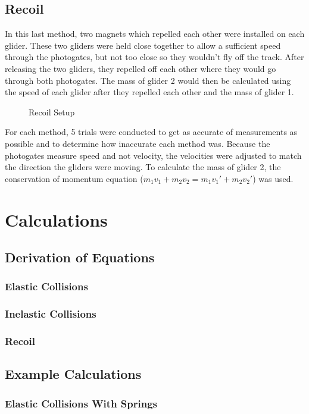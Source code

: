 \documentclass[12pt]{article}
\begin{document}
\subsection{Recoil}
In this last method, two magnets which repelled each other were installed on each glider. These two gliders were held close together to allow a sufficient speed through the photogates, but not too close so they wouldn't fly off the track. After releasing the two gliders, they repelled off each other where they would go through both photogates. The mass of glider 2 would then be calculated using the speed of each glider after they repelled each other and the mass of glider 1.
\begin{figure}[H]   %
    \centering
    \caption{Recoil Setup}
\end{figure}
For each method, 5 trials were conducted to get as accurate of measurements as possible and to determine how inaccurate each method was. Because the photogates measure speed and not velocity, the velocities were adjusted to match the direction the gliders were moving. To calculate the mass of glider 2, the conservation of momentum equation ($m_1v_1+m_2v_2=m_1v_1'+m_2v_2'$) was used.

\newpage
\section{Calculations}
\subsection{Derivation of Equations}
\subsubsection{Elastic Collisions}
\subsubsection{Inelastic Collisions}
\subsubsection{Recoil}

\subsection{Example Calculations}
\subsubsection{Elastic Collisions With Springs}
\end{document}
